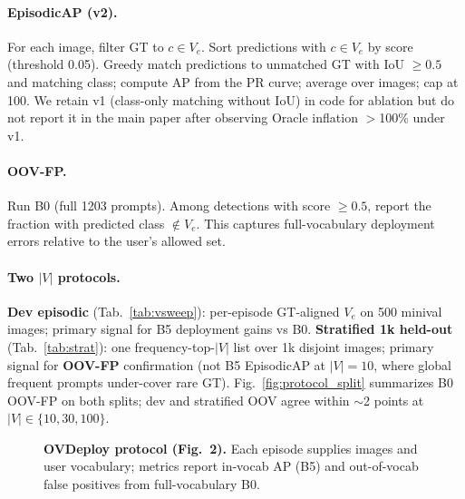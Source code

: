 \documentclass[10pt,twocolumn,letterpaper]{article}
\begin{document}
\paragraph{EpisodicAP (v2).} For each image, filter GT to $c \in V_e$. Sort predictions with $c \in V_e$ by score (threshold 0.05). Greedy match predictions to unmatched GT with IoU $\ge 0.5$ and matching class; compute AP from the PR curve; average over images; cap at 100.
We retain v1 (class-only matching without IoU) in code for ablation but do not report it in the main paper after observing Oracle inflation $>$100\% under v1.

\paragraph{OOV-FP.} Run B0 (full 1203 prompts). Among detections with score $\ge 0.5$, report the fraction with predicted class $\notin V_e$. This captures full-vocabulary deployment errors relative to the user's allowed set.

\paragraph{Two $|V|$ protocols.}
\label{par:two_v}
\textbf{Dev episodic} (Tab.~\ref{tab:vsweep}): per-episode GT-aligned $V_e$ on 500 minival images; primary signal for B5 deployment gains vs B0.
\textbf{Stratified 1k held-out} (Tab.~\ref{tab:strat}): one frequency-top-$|V|$ list over 1k disjoint images; primary signal for \textbf{OOV-FP} confirmation (not B5 EpisodicAP at $|V|{=}10$, where global frequent prompts under-cover rare GT).
Fig.~\ref{fig:protocol_split} summarizes B0 OOV-FP on both splits; dev and stratified OOV agree within $\sim$2 points at $|V|{\in}\{10,30,100\}$.

\begin{figure}[t]
\centering
{}
\caption{\textbf{OVDeploy protocol (Fig.~2).} Each episode supplies images and user vocabulary; metrics report in-vocab AP (B5) and out-of-vocab false positives from full-vocabulary B0.}
\label{fig:protocol}
\end{figure}
\end{document}
